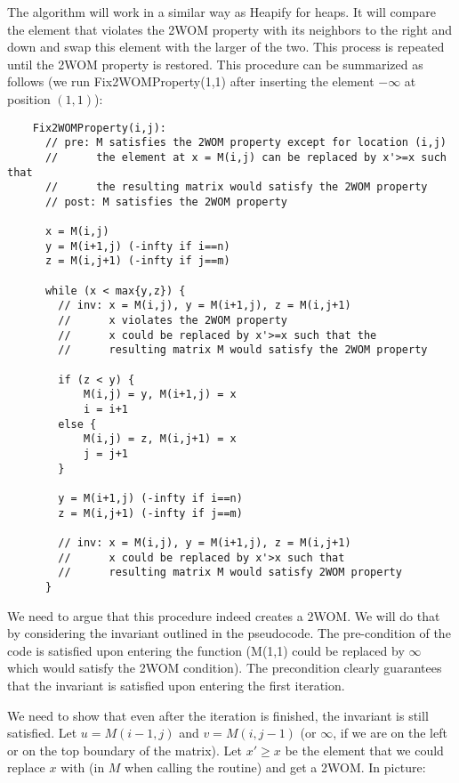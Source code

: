 \begin{enumerate}
\begin{solution}
\begin{itemize}
    The algorithm will work in a similar way as Heapify for heaps.
    It will compare the element that violates the 2WOM property with
    its neighbors to the right and down and swap this element with
    the larger of the two. This process is repeated until the 2WOM
    property is restored. This procedure can be summarized as follows
    (we run Fix2WOMProperty(1,1) after inserting the element $-\infty$
    at position $(1,1)$):

    \begin{verbatim}
    Fix2WOMProperty(i,j):
      // pre: M satisfies the 2WOM property except for location (i,j)
      //      the element at x = M(i,j) can be replaced by x'>=x such that
      //      the resulting matrix would satisfy the 2WOM property
      // post: M satisfies the 2WOM property

      x = M(i,j)
      y = M(i+1,j) (-infty if i==n)
      z = M(i,j+1) (-infty if j==m)

      while (x < max{y,z}) {
        // inv: x = M(i,j), y = M(i+1,j), z = M(i,j+1)
        //      x violates the 2WOM property
        //      x could be replaced by x'>=x such that the
        //      resulting matrix M would satisfy the 2WOM property

        if (z < y) {
            M(i,j) = y, M(i+1,j) = x
            i = i+1
        else {
            M(i,j) = z, M(i,j+1) = x
            j = j+1
        }

        y = M(i+1,j) (-infty if i==n)
        z = M(i,j+1) (-infty if j==m)

        // inv: x = M(i,j), y = M(i+1,j), z = M(i,j+1)
        //      x could be replaced by x'>x such that
        //      resulting matrix M would satisfy 2WOM property
      }
    \end{verbatim}

    We need to argue that this procedure indeed creates a 2WOM.  We
    will do that by considering the invariant outlined in the pseudocode.
    The pre-condition of the code is satisfied upon entering the function
    (M(1,1) could be replaced by $\infty$ which would satisfy the 2WOM
    condition).  The precondition clearly guarantees that the
    invariant is satisfied upon entering the first iteration.

    We need to show that even after the iteration is finished, the
    invariant is still satisfied.  Let $u=M(i-1,j)$ and $v=M(i,j-1)$
    (or $\infty$, if we are on the left or on the top boundary of the
    matrix).  Let $x'\geq x$ be the element that we could replace $x$
    with (in $M$ when calling the routine) and get a 2WOM.  In
    picture:


\end{itemize}
\end{solution}
\end{enumerate}
